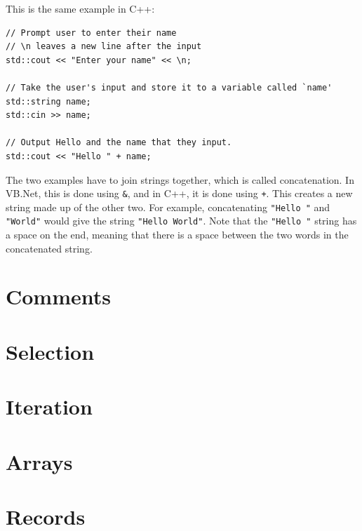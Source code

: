     This is the same example in C++:

    \begin{verbatim}
// Prompt user to enter their name
// \n leaves a new line after the input
std::cout << "Enter your name" << \n;

// Take the user's input and store it to a variable called `name'
std::string name;
std::cin >> name;

// Output Hello and the name that they input.
std::cout << "Hello " + name;
    \end{verbatim}

    The two examples have to join strings together, which is called concatenation.
    In VB.Net, this is done using \verb|&|, and in C++, it is done using \verb|+|.
    This creates a new string made up of the other two.
    For example, concatenating \verb|"Hello "| and \verb|"World"| would give the string \verb|"Hello World"|.
    Note that the \verb|"Hello "| string has a space on the end, meaning that there is a space between the two words in the concatenated string.

    \newpage

\section{Comments} \label{comments}
    \newpage

\section{Selection} \label{selection}
    \newpage

\section{Iteration} \label{iteration}
    \newpage

\section{Arrays} \label{arrays}
    \newpage

\section{Records} \label{records}
    \newpage